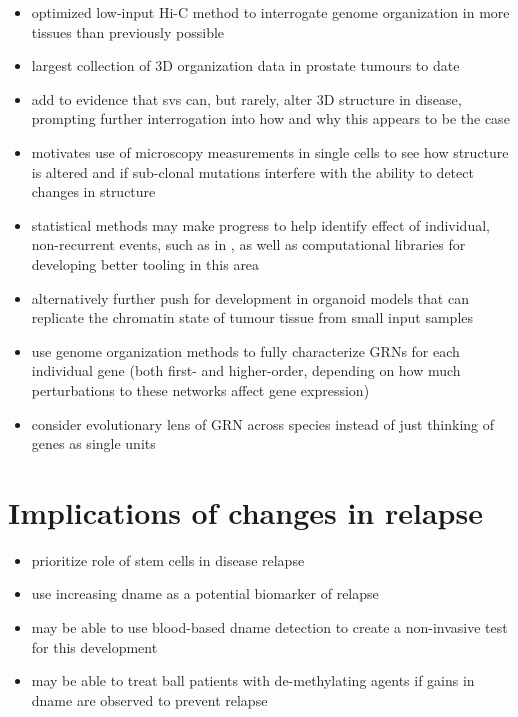 \begin{itemize}
  \item optimized low-input Hi-C method to interrogate genome organization in more tissues than previously possible
  \item largest collection of 3D organization data in prostate tumours to date
  \item add to evidence that \glspl{sv} can, but rarely, alter 3D structure in disease, prompting further interrogation into how and why this appears to be the case
  \item motivates use of microscopy measurements in single cells to see how structure is altered and if sub-clonal mutations interfere with the ability to detect changes in structure
  \item statistical methods may make progress to help identify effect of individual, non-recurrent events, such as in , as well as computational libraries for developing better tooling in this area
  \item alternatively further push for development in organoid models that can replicate the chromatin state of tumour tissue from small input samples
  \item use genome organization methods to fully characterize GRNs for each individual gene (both first- and higher-order, depending on how much perturbations to these networks affect gene expression)
  \item consider evolutionary lens of GRN across species instead of just thinking of genes as single units
\end{itemize}

\section{Implications of  changes in relapse}

\begin{itemize}
  \item prioritize role of stem cells in disease relapse
  \item use increasing \gls{dname} as a potential biomarker of relapse
  \item may be able to use blood-based \gls{dname} detection to create a non-invasive test for this development
  \item may be able to treat \gls{ball} patients with de-methylating agents if gains in \gls{dname} are observed to prevent relapse
\end{itemize}

